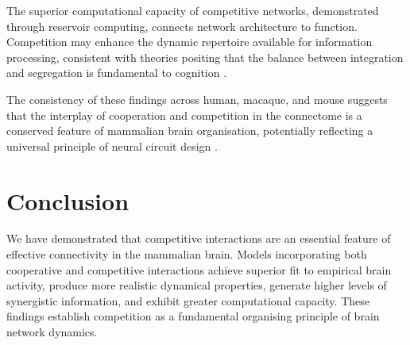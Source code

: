 \documentclass{article}
\begin{document}
The superior computational capacity of competitive networks, demonstrated through reservoir computing, connects network architecture to function. Competition may enhance the dynamic repertoire available for information processing, consistent with theories positing that the balance between integration and segregation is fundamental to cognition \citep{dehaene2011experimental, mashour2020conscious}.

The consistency of these findings across human, macaque, and mouse suggests that the interplay of cooperation and competition in the connectome is a conserved feature of mammalian brain organisation, potentially reflecting a universal principle of neural circuit design \citep{suarez2023learning, deco2014great}.

\section{Conclusion}

We have demonstrated that competitive interactions are an essential feature of effective connectivity in the mammalian brain. Models incorporating both cooperative and competitive interactions achieve superior fit to empirical brain activity, produce more realistic dynamical properties, generate higher levels of synergistic information, and exhibit greater computational capacity. These findings establish competition as a fundamental organising principle of brain network dynamics.



\end{document}
